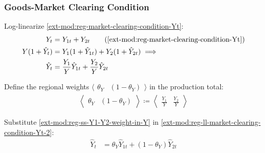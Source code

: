 \documentclass[../thesis.tex]{subfiles}
\begin{document}



\subsubsection*{Goods-Market Clearing Condition}

Log-linearize \ref{ext-mod:reg-market-clearing-condition-Yt}:
\begin{alignat}{2}
	Y_{t} &= Y_{1 t} + Y_{2 t} \tag{\ref{ext-mod:reg-market-clearing-condition-Yt}} \\
	Y (1 +\hat{Y}_{t}) &= Y_{1} (1 +\hat{Y}_{1t}) + Y_{2} (1 +\hat{Y}_{2t}) \implies \nonumber \\
	\hat{Y}_{t} &= \frac{Y_{1}}{Y} \hat{Y}_{1t} + \frac{Y_{2}}{Y} \hat{Y}_{2t} \label{ext-mod:reg-ll-market-clearing-condition-Yt-2}
\end{alignat}


Define the regional weights $\langle \begin{matrix} \theta_{Y} & (1-\theta_{Y}) \end{matrix} \rangle$ in the production total:
\begin{align}
	\left\langle \begin{matrix} \theta_{Y} & (1-\theta_{Y}) \end{matrix} \right\rangle \coloneq \left\langle \begin{matrix} \frac{Y_{1}}{Y} & \frac{Y_{2}}{Y} \end{matrix} \right\rangle \label{ext-mod:reg-ss-Y1-Y2-weight-in-Y}
\end{align}


Substitute \ref{ext-mod:reg-ss-Y1-Y2-weight-in-Y} in \ref{ext-mod:reg-ll-market-clearing-condition-Yt-2}:
\begin{align}
	\hat{Y}_{t} &= \theta_{Y} \hat{Y}_{1t} + (1-\theta_{Y}) \hat{Y}_{2t} \label{ext-mod:reg-ll-market-clearing-condition-Yt-3}
\end{align}

\end{document}
